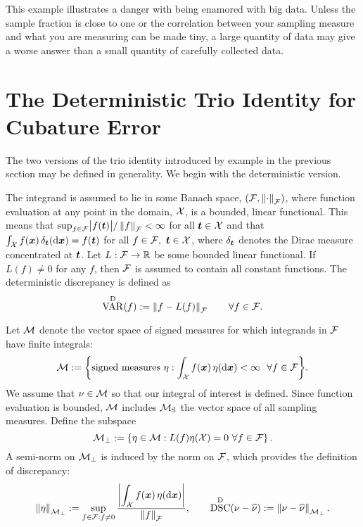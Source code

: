 \documentclass[graybox,footinfo]{svmult}
\DeclareMathOperator{\disc}{DSC}
\DeclareMathOperator{\Var}{VAR}
\begin{document}
This example illustrates a danger with being enamored with big data. Unless 
the 
sample fraction is close to one or the correlation between 
your sampling measure and what you are measuring can be made tiny, a large quantity of 
data may give a worse answer than a small quantity of carefully collected data.

\begin{FJHLesson}
	\FJHLessonOne
\end{FJHLesson}

\section{The Deterministic Trio Identity for Cubature Error} \label{FJH:sec:dettrio}
The two versions of the trio identity introduced by example in the previous section may 
be defined in generality. We begin with the deterministic version.  

The integrand is 
assumed to lie in some Banach space, $(\mathcal{F},\left \lVert \cdot \right \rVert_{\mathcal{F}})$, where function 
evaluation at any point  in the 
domain,  $\mathcal{X}$, is a 
bounded, linear functional.  This means that $\sup_{f \in \mathcal{F}} \bigl \lvert f({\boldsymbol{t}}) \bigr \rvert/\left \lVert f \right \rVert_{\mathcal{F}} < 
\infty$ for all ${\boldsymbol{t}} \in \mathcal{X}$ and that $\int_{\mathcal{X}} f({\boldsymbol{x}}) \, \delta_{{\boldsymbol{t}}}(\mathrm{d}{\boldsymbol{x}}) =f({\boldsymbol{t}})$ 
for all $f \in \mathcal{F}, \ {\boldsymbol{t}} \in \mathcal{X}$, where $\delta_{{\boldsymbol{t}}}$ denotes the Dirac measure 
concentrated at ${\boldsymbol{t}}$.  Let $L :\mathcal{F} \to {\mathbb{R}}$ be some bounded 
linear functional.  If $L(f) \ne 0$ for any $f$, then $\mathcal{F}$ is assumed to contain all 
constant functions.  The deterministic discrepancy is defined as 
\begin{equation}  \label{FJH:eq:detvardef}
\Var^{\Dt}(f) := \norm{f- L(f)}_{\cf} \qquad \forall f \in \cf.
\end{equation} 

Let $\mathcal{M}$ denote the vector space of signed measures for which integrands in $\mathcal{F}$ 
have finite integrals:
\begin{equation*}
\cm : = \biggl \{\text{signed measures } \eta : \int_{\cx} f(\bsx) \, \eta(\D\bsx) < \infty \ \ 
\forall f \in \cf \biggr \}.
\end{equation*}
We assume that $\nu \in \mathcal{M}$ so that our integral of interest is defined.  Since function 
evaluation is bounded, $\mathcal{M}$ includes $\mathcal{M}_{\textup{S}}$ the vector space of all 
sampling measures.  Define the subspace  
\begin{equation} \label{FJH:eq:Mperpdef}
\cm_\bot : = \left \{\eta \in \cm :  L(f) \eta(\cx) = 0  \ \forall f \in \cf
\right\}.
\end{equation} 
A semi-norm on $\mathcal{M}_\bot$ is induced by the norm on $\mathcal{F}$, which provides the 
definition of discrepancy:
\begin{equation} \label{FJH:eq:detdiscdef}
\snorm{\eta}_{\cm_\bot}  : =\sup_{f \in \cf : f \ne 0} \frac{\displaystyle \biggabs{\int_{\cx} 
f(\bsx) \, \eta(\D \bsx)}}{\norm{f}_{\cf}}, \qquad \disc^\Dt(\nu - \hnu) : = \norm{\nu - 
\hnu}_{\cm_\bot}.
\end{equation}
\end{document}

